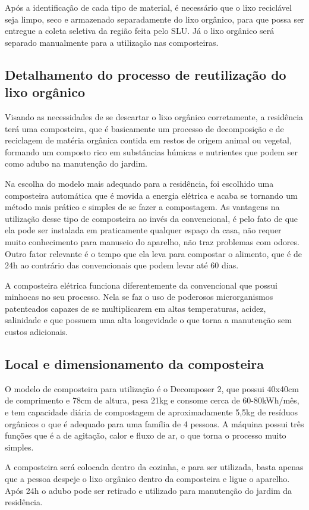 	Após a identificação de cada tipo de material, é necessário que o lixo reciclável seja limpo, seco e armazenado separadamente do lixo orgânico, para que possa ser entregue a coleta seletiva da região feita pelo SLU. Já o lixo orgânico será separado manualmente para a utilização nas composteiras.

\subsection{Detalhamento do processo de reutilização do lixo orgânico}

	Visando as necessidades de se descartar o lixo orgânico corretamente, a residência terá uma composteira, que é basicamente um processo de decomposição e de reciclagem de matéria orgânica contida em restos de origem animal ou vegetal, formando um composto rico em substâncias húmicas e nutrientes que podem ser como adubo na manutenção do jardim.

	Na escolha do modelo mais adequado para a residência, foi escolhido uma composteira automática que é movida a energia elétrica e acaba se tornando um método mais prático e simples de se fazer a compostagem. As vantagens na utilização desse tipo de composteira ao invés da convencional, é pelo fato de que ela pode ser instalada em praticamente qualquer espaço da casa, não requer muito conhecimento para manuseio do aparelho, não traz problemas com odores. Outro fator relevante é o tempo que ela leva para compostar o alimento, que é de 24h ao contrário das convencionais que podem levar até 60 dias.

	A composteira elétrica funciona diferentemente da convencional que possui minhocas no seu processo. Nela se faz o uso de poderosos microrganismos patenteados capazes de se multiplicarem em altas temperaturas, acidez, salinidade e que possuem uma alta longevidade o que torna a manutenção sem custos adicionais.

\subsection{Local e dimensionamento da composteira}

	O modelo de composteira para utilização é o Decomposer 2, que possui 40x40cm de comprimento e 78cm de altura, pesa 21kg e consome cerca de 60-80kWh/mês, e tem capacidade diária de compostagem de aproximadamente 5,5kg de resíduos orgânicos o que é adequado para uma família de 4 pessoas.  A máquina possui três funções que é a de agitação, calor e fluxo de ar, o que torna o processo muito simples.

	A composteira será colocada dentro da cozinha, e para ser utilizada, basta apenas que a pessoa despeje o lixo orgânico dentro da composteira e ligue o aparelho. Após 24h o adubo pode ser retirado e utilizado para manutenção do jardim da residência.


